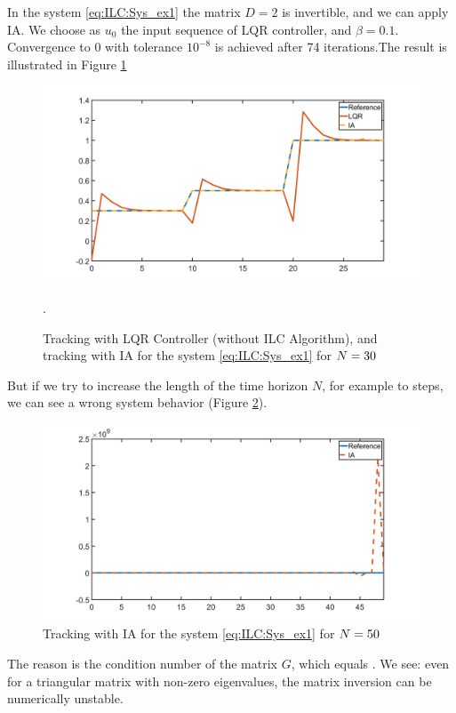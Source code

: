 \begin{exam}
	\label{ex:ILC:badIA}
	In the system \eqref{eq:ILC:Sys_ex1} the matrix $D = 2$ is invertible, and we can apply IA. We choose as $u_0$ the input sequence of LQR controller, and $\beta = 0.1$. Convergence to 0 with tolerance $10^{-8}$ is achieved after 74 iterations.The result is illustrated in Figure \ref{img:ILC:Ex1_IA}
			
	\begin{figure}[ht]
		\includegraphics[width=\textwidth]{fig/Ex1_IA.jpg}
		\caption{Tracking with LQR Controller (without ILC Algorithm), and tracking with IA for the system \eqref{eq:ILC:Sys_ex1} for $N = 30$}. 		\label{img:ILC:Ex1_IA}
	\end{figure}
	
	But if we try to increase the length of the time horizon $N$, for example to \IAbad steps, we can see a wrong system behavior (Figure \ref{img:ILC:Ex1_IAbad}). 
		
			\begin{figure}[ht!]
			\centering
			\includegraphics[width=\textwidth]{fig/Ex1_IAbad.jpg}
			\caption{Tracking with IA for the system \eqref{eq:ILC:Sys_ex1} for $N = 50$}
			\label{img:ILC:Ex1_IAbad}
		\end{figure}
	
	The reason is the condition number of the matrix $G$, which equals \badCondNb. We see: even for a triangular matrix with non-zero eigenvalues, the matrix inversion can be numerically unstable.
		
		
\end{exam}

